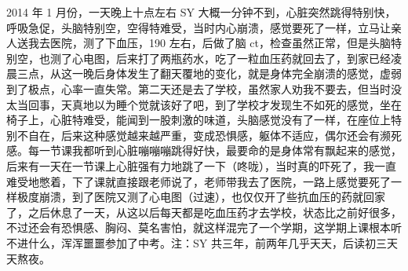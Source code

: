 \begin{case}
    2014 年 1 月份，一天晚上十点左右 SY 大概一分钟不到，心脏突然跳得特别快，呼吸急促，头脑特别空，空得特难受，当时内心崩溃，感觉要死了一样，立马让亲人送我去医院，测了下血压，190 左右，后做了脑 ct，检查虽然正常，但是头脑特别空，也测了心电图，后来打了两瓶药水，吃了一粒血压药就回去了，到家已经凌晨三点，从这一晚后身体发生了翻天覆地的变化，就是身体完全崩溃的感觉，虚弱到了极点，心率一直失常。第二天还是去了学校，虽然家人劝我不要去，但当时没太当回事，天真地以为睡个觉就该好了吧，到了学校才发现生不如死的感觉，坐在椅子上，心脏特难受，能闻到一股刺激的味道，头脑感觉没有了一样，在座位上特别不自在，后来这种感觉越来越严重，变成恐惧感，躯体不适应，偶尔还会有濒死感。每一节课我都听到心脏嘣嘣嘣跳得好快，最要命的是身体常有飘起来的感觉，后来有一天在一节课上心脏强有力地跳了一下（咚咙），当时真的吓死了，我一直难受地憋着，下了课就直接跟老师说了，老师带我去了医院，一路上感觉要死了一样极度崩溃，到了医院又测了心电图（过速），也仅仅开了些抗血压的药就回家了，之后休息了一天，从这以后每天都是吃血压药才去学校，状态比之前好很多，不过还会有恐惧感、胸闷、莫名害怕，就这样混完了一个学期，这学期上课根本听不进什么，浑浑噩噩参加了中考。注：SY 共三年，前两年几乎天天，后读初三天天熬夜。


\end{case}
